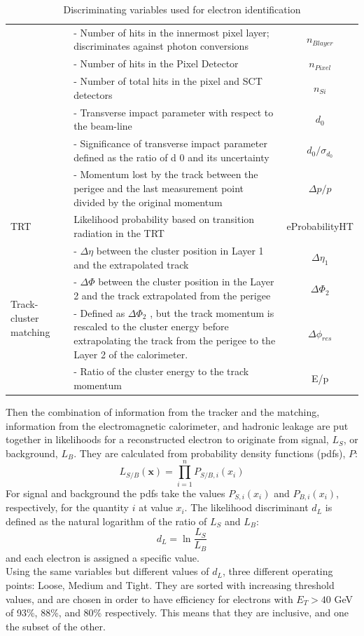 \documentclass[a4paper, oneside]{book}
\begin{document}
\begin{table}
\begin{tabular}{lp{8cm}c}
					& - Number of hits in the innermost pixel layer; discriminates against photon conversions & $n_{Blayer}$ \\
					& - Number of hits in the Pixel Detector & $n_{Pixel}$ \\
					& - Number of total hits in the pixel and SCT detectors & $n_{Si}$ \\
					& - Transverse impact parameter with respect to the beam-line & $d_0$ \\
					& - Significance of transverse impact parameter defined as the ratio of d 0 and its uncertainty & $d_0/\sigma_{d_0}$ \\
					& - Momentum lost by the track between the perigee and the last measurement point divided by the original momentum & $\Delta p/p$ \\
					\midrule 
					TRT & Likelihood probability based on transition radiation in the TRT & eProbabilityHT \\
					\midrule 
					\multirow[t]{4}{*}{Track-cluster matching}
					& - $\Delta \eta$ between the cluster position in Layer 1 and the extrapolated track & $\Delta \eta_1$ \\
					& - $\Delta \Phi$ between the cluster position in the Layer 2 and the track extrapolated from the perigee & $\Delta \Phi_2$ \\
					& - Defined as $\Delta \Phi_2$ , but the track momentum is rescaled to the cluster energy before extrapolating the track from the perigee to the Layer 2 of the calorimeter. & $\Delta \phi_{res}$ \\
					& - Ratio of the cluster energy to the track momentum & E/p \\
					\bottomrule[1.5pt]
				\end{tabular}
				\caption{Discriminating variables used for electron identification \cite{Identification}}
				\label{tab:el parameters}
			\end{table}
			Then the combination of information from the tracker and the matching, information from the electromagnetic calorimeter, and hadronic leakage  are put together in likelihoods for a reconstructed electron to originate from signal,
			$L_S$, or background, $L_B$. They are calculated from probability density functions (pdfs), $P$:
			$$
			L_{S/B}(\textbf{x}) = \prod_{i=1}^{n}P_{S/B,i}(x_i)
			$$
			For signal and background the pdfs take the values $P_{S,i}(x_i)$ and $P_{B,i}(x_i)$, respectively, for the quantity $i$ at value $x_i$. The likelihood discriminant $d_L$ is defined as the natural logarithm of the ratio of $L_S$ and $L_B$:
			$$
			d_L = \ln{\frac{L_S}{L_B}}
			$$
			and each electron is assigned a specific value.\\
			Using the same variables but different values of $d_L$, three different operating points: Loose, Medium and Tight. They are sorted with increasing threshold values, and are chosen in order to have efficiency for electrons with $E_T > 40$ GeV of 93\%, 88\%, and 80\% respectively. This means that they are inclusive, and one the subset of the other.
			
\end{document}
